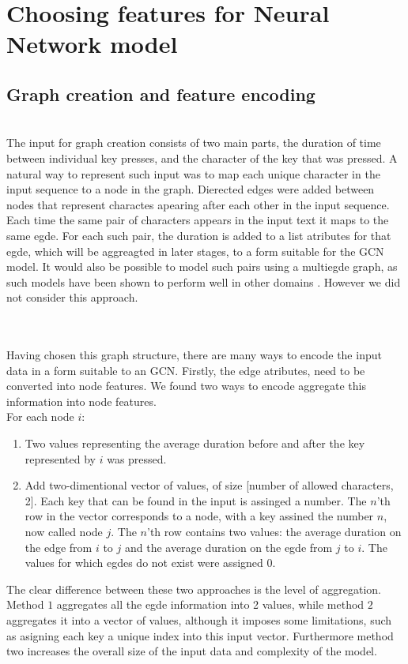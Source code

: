 
\section{Choosing features for Neural Network model}

\subsection{Graph creation and feature encoding}
\\
The input for graph creation consists of two main parts, the duration of time between individual key presses, and the character of the key that was pressed.
A natural way to represent such input was to map each unique character in the input sequence to a node in the graph. 
Dierected edges were added between nodes that represent charactes apearing after each other in the input sequence. 
Each time the same pair of characters appears in the input text it maps to the same egde. For each such pair, the duration is added to a list atributes for that egde, which will be aggreagted in later stages, to a form suitable for the GCN model. It would also be possible to model such pairs using a multiegde graph, as such models have been shown to perform well in other domains . However we did not consider this approach. 

\\
\\
Having chosen this graph structure, there are many ways to encode the input data in a form suitable to an GCN.
Firstly, the edge atributes, need to be converted into node features. We found two ways to encode aggregate this information into node features.\\  
For each node $i$:
\begin{enumerate}
	\item Two values representing the average duration before and after the key represented by $i$ was pressed.
	\item Add two-dimentional vector of values, of size [number of allowed characters, 2]. Each key that can be found in the input is assinged a number. The $n$'th row in the vector corresponds to a node, with a key assined the number $n$, now called node $j$. The $n$'th row contains two values: the average duration on the edge from $i$ to $j$ and the average duration on the egde from $j$ to $i$. The values for which egdes do not exist were assigned 0.
\end{enumerate}
The clear difference between these two approaches is the level of aggregation. Method $1$ aggregates all the egde information into 2 values, while method $2$ aggregates it into a vector of values, although it imposes some limitations, such as asigning each key a unique index into this input vector. Furthermore method two increases the overall size of the input data and complexity of the model.

